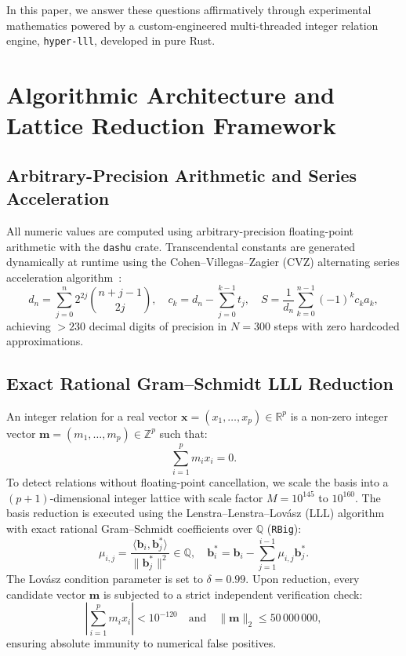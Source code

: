 \documentclass[11pt,a4paper]{article}
\theoremstyle{definition}
\begin{document}
In this paper, we answer these questions affirmatively through experimental mathematics powered by a custom-engineered multi-threaded integer relation engine, \texttt{hyper-lll}, developed in pure Rust.

\section{Algorithmic Architecture and Lattice Reduction Framework}

\subsection{Arbitrary-Precision Arithmetic and Series Acceleration}
All numeric values are computed using arbitrary-precision floating-point arithmetic with the \texttt{dashu} crate. Transcendental constants are generated dynamically at runtime using the Cohen--Villegas--Zagier (CVZ) alternating series acceleration algorithm~\cite{cohen2000}:
\begin{equation}
d_n = \sum_{j=0}^n 2^{2j} \binom{n+j-1}{2j}, \quad c_k = d_n - \sum_{j=0}^{k-1} t_j, \quad S = \frac{1}{d_n} \sum_{k=0}^{n-1} (-1)^k c_k a_k,
\end{equation}
achieving $>230$ decimal digits of precision in $N = 300$ steps with zero hardcoded approximations.

\subsection{Exact Rational Gram--Schmidt LLL Reduction}
An integer relation for a real vector $\mathbf{x} = (x_1, \dots, x_p) \in \mathbb{R}^p$ is a non-zero integer vector $\mathbf{m} = (m_1, \dots, m_p) \in \mathbb{Z}^p$ such that:
\begin{equation}
\sum_{i=1}^p m_i x_i = 0.
\end{equation}
To detect relations without floating-point cancellation, we scale the basis into a $(p+1)$-dimensional integer lattice with scale factor $M = 10^{145}$ to $10^{160}$. The basis reduction is executed using the Lenstra--Lenstra--Lov\'asz (LLL) algorithm~\cite{lenstra1982} with exact rational Gram--Schmidt coefficients over $\mathbb{Q}$ (\texttt{RBig}):
\begin{equation}
\mu_{i,j} = \frac{\langle \mathbf{b}_i, \mathbf{b}_j^* \rangle}{\|\mathbf{b}_j^*\|^2} \in \mathbb{Q}, \quad \mathbf{b}_i^* = \mathbf{b}_i - \sum_{j=1}^{i-1} \mu_{i,j} \mathbf{b}_j^*.
\end{equation}
The Lov\'asz condition parameter is set to $\delta = 0.99$. Upon reduction, every candidate vector $\mathbf{m}$ is subjected to a strict independent verification check:
\begin{equation}
\left| \sum_{i=1}^p m_i x_i \right| < 10^{-120} \quad \text{and} \quad \|\mathbf{m}\|_2 \le 50\,000\,000,
\end{equation}
ensuring absolute immunity to numerical false positives.
\end{document}
